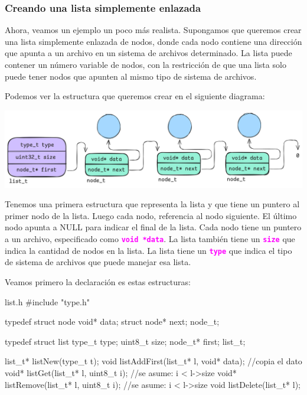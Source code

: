 \documentclass[]{scrartcl}
\newcommand{\hl}[1]{\textcolor{magenta}{\textbf{\texttt{#1}}}}
\begin{document}
\subsubsection*{Creando una lista simplemente enlazada}

Ahora, veamos un ejemplo un poco más realista. Supongamos que queremos crear una lista simplemente enlazada de nodos, donde cada nodo contiene una dirección que apunta a un archivo en un sistema de archivos determinado. La lista puede contener un número variable de nodos, con la restricción de que una lista solo puede tener nodos que apunten al mismo tipo de sistema de archivos.

Podemos ver la estructura que queremos crear en el siguiente diagrama:

\begin{center}
  \includegraphics[scale=0.2]{./img/linkedlist.png}  
\end{center}

Tenemos una primera estructura que representa la lista y que tiene un puntero al primer nodo de la lista. Luego cada nodo, referencia al nodo siguiente. El último nodo apunta a NULL para indicar el final de la lista. Cada nodo tiene un puntero a un archivo, especificado como \hl{void *data}. La lista también tiene un \hl{size} que indica la cantidad de nodos en la lista. La lista tiene un \hl{type} que indica el tipo de sistema de archivos que puede manejar esa lista. 

Veamos primero la declaración es estas estructuras:

\begin{cbox}[]{list.h}
  #include "type.h"
  
  typedef struct node {
    void* data;
    struct node* next;
  } node_t;
  
  typedef struct list {
    type_t type;
    uint8_t size;
    node_t* first;
  } list_t;

  list_t* listNew(type_t t);
  void  listAddFirst(list_t* l, void* data); //copia el dato
  void* listGet(list_t* l, uint8_t i); //se asume: i < l->size
  void* listRemove(list_t* l, uint8_t i); //se asume: i < l->size
  void  listDelete(list_t* l);

\end{cbox}
\end{document}
